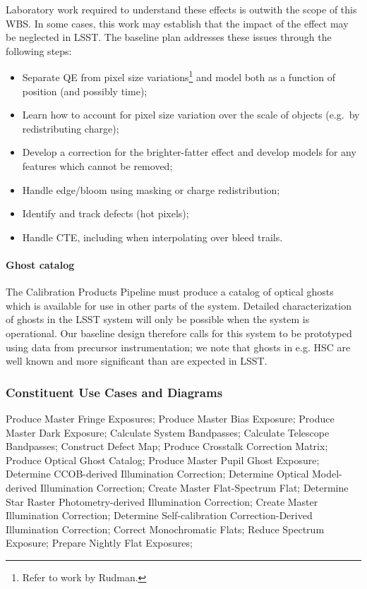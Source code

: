 \documentclass[12pt]{article}
\begin{document}
Laboratory work required to understand these effects is outwith the scope of this WBS\@. In some cases, this work may establish that the impact of the effect may be neglected in LSST\@. The baseline plan addresses these issues through the following steps:

\begin{itemize}
  \item{Separate QE from pixel size variations\footnote{Refer to work by Rudman.} and model both as a function of position (and possibly time);}
  \item{Learn how to account for pixel size variation over the scale of objects (e.g.\ by redistributing charge);}
  \item{Develop a correction for the brighter-fatter effect and develop models for any features which cannot be removed;}
  \item{Handle edge/bloom using masking or charge redistribution;}
  \item{Identify and track defects (hot pixels);}
  \item{Handle CTE, including when interpolating over bleed trails.}
\end{itemize}

\paragraph{Ghost catalog}

The Calibration Products Pipeline must produce a catalog of optical ghosts which is available for use in other parts of the system. Detailed characterization of ghosts in the LSST system will only be possible when the system is operational. Our baseline design therefore calls for this system to be prototyped using data from precursor instrumentation; we note that ghosts in e.g. HSC are well known and more significant than are expected in LSST.

\subsubsection{Constituent Use Cases and Diagrams}

Produce Master Fringe Exposures; Produce Master Bias Exposure; Produce Master Dark Exposure; Calculate System Bandpasses; Calculate Telescope Bandpasses; Construct Defect Map; Produce Crosstalk Correction Matrix; Produce Optical Ghost Catalog; Produce Master Pupil Ghost Exposure; Determine CCOB-derived Illumination Correction; Determine Optical Model-derived Illumination Correction; Create Master Flat-Spectrum Flat; Determine Star Raster Photometry-derived Illumination Correction; Create Master Illumination Correction; Determine Self-calibration Correction-Derived Illumination Correction; Correct Monochromatic Flats; Reduce Spectrum Exposure; Prepare Nightly Flat Exposures;
\end{document}
